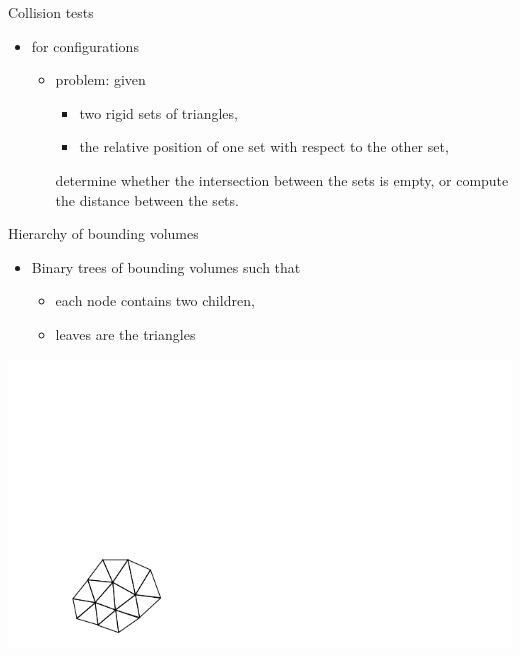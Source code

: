 
%
%
\begin{frame} {Collision tests}
  \begin{itemize}
  \item for configurations
    \begin{itemize}
    \item problem: given
      \begin{itemize}
      \item two rigid sets of triangles,
      \item the relative position of one set with respect to the other set,
      \end{itemize}
      determine whether the intersection between the sets is empty, or compute
      the distance between the sets.
    \end{itemize}
  \end{itemize}
\end{frame}

%
%
\begin{frame} {Hierarchy of bounding volumes}
  \begin{itemize}
  \item Binary trees of bounding volumes such that
    \begin{itemize}
    \item each node contains two children,
    \item leaves are the triangles
    \end{itemize}
  \end{itemize}
  \centerline {
    \includegraphics[width=.8\linewidth]{figures/bvh1.pdf}
  }
\end{frame}

